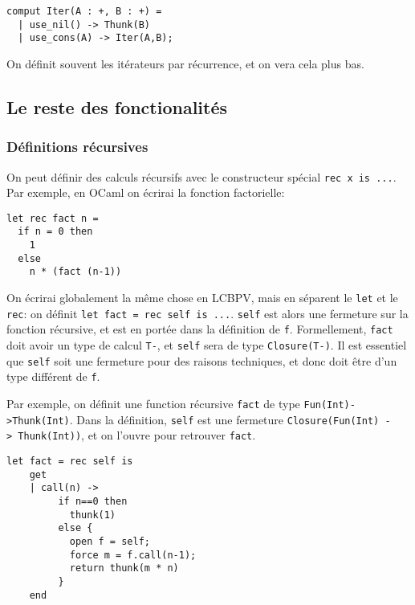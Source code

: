 \documentclass[
]{article}
\begin{document}
\begin{verbatim}
comput Iter(A : +, B : +) =
  | use_nil() -> Thunk(B)
  | use_cons(A) -> Iter(A,B);
\end{verbatim}

On définit souvent les itérateurs par récurrence, et on vera cela plus
bas.

\hypertarget{le-reste-des-fonctionalituxe9s}{%
\subsection{Le reste des
fonctionalités}\label{le-reste-des-fonctionalituxe9s}}

\hypertarget{duxe9finitions-ruxe9cursives}{%
\subsubsection{Définitions
récursives}\label{duxe9finitions-ruxe9cursives}}

On peut définir des calculs récursifs avec le constructeur spécial
\texttt{rec\ x\ is\ ...}. Par exemple, en OCaml on écrirai la fonction
factorielle:

\begin{verbatim}
let rec fact n = 
  if n = 0 then
    1 
  else 
    n * (fact (n-1))
\end{verbatim}

On écrirai globalement la même chose en LCBPV, mais en séparent le
\texttt{let} et le \texttt{rec}: on définit
\texttt{let\ fact\ =\ rec\ self\ is\ ...}. \texttt{self} est alors une
fermeture sur la fonction récursive, et est en portée dans la définition
de \texttt{f}. Formellement, \texttt{fact} doit avoir un type de calcul
\texttt{T-}, et \texttt{self} sera de type \texttt{Closure(T-)}. Il est
essentiel que \texttt{self} soit une fermeture pour des raisons
techniques, et donc doit être d'un type différent de \texttt{f}.

Par exemple, on définit une function récursive \texttt{fact} de type
\texttt{Fun(Int)-\textgreater{}Thunk(Int)}. Dans la définition,
\texttt{self} est une fermeture
\texttt{Closure(Fun(Int)\ -\textgreater{}\ Thunk(Int))}, et on l'ouvre
pour retrouver \texttt{fact}.

\begin{verbatim}
let fact = rec self is
    get
    | call(n) -> 
         if n==0 then 
           thunk(1) 
         else {
           open f = self;
           force m = f.call(n-1);
           return thunk(m * n)
         }
    end
\end{verbatim}
\end{document}
